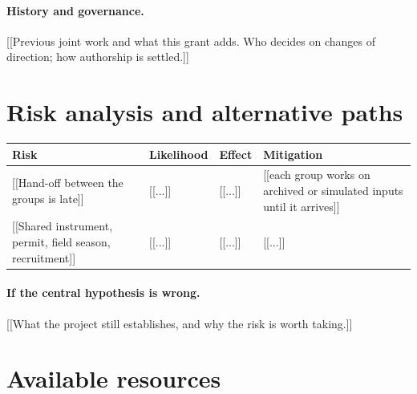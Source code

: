 \documentclass[12pt,a4paper]{article}
\begin{document}
\paragraph{History and governance.} [[Previous joint work and what this grant adds. Who
decides on changes of direction; how authorship is settled.]]

\section{Risk analysis and alternative paths}

\begin{center}
\begin{tabularx}{\linewidth}{XllX}
\toprule
Risk & Likelihood & Effect & Mitigation \\
\midrule
{}[[Hand-off between the groups is late]] & [[...]] & [[...]] & [[each group works on archived or simulated inputs until it arrives]] \\
{}[[Shared instrument, permit, field season, recruitment]] & [[...]] & [[...]] & [[...]] \\
\bottomrule
\end{tabularx}
\end{center}

\paragraph{If the central hypothesis is wrong.} [[What the project still establishes, and why
the risk is worth taking.]]

\section{Available resources}
\end{document}
